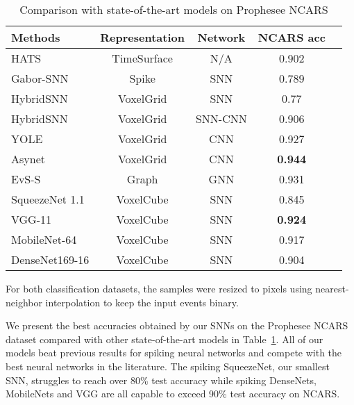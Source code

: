 \documentclass[conference]{IEEEtran}
\begin{document}
\begin{table}[]
\renewcommand{\arraystretch}{1.3}
\centering
\caption{Comparison with state-of-the-art models on Prophesee NCARS}
\begin{tabular}{lcccc}
\hline
\textbf{Methods}     & \textbf{Representation}     & \textbf{Network}   & \textbf{NCARS acc}\\ \hline
HATS \cite{ncars}       & TimeSurface   & N/A          & 0.902                        \\
Gabor-SNN \cite{ncars}   & Spike         & SNN       & 0.789                   \\
HybridSNN \cite{hybridsnn} & VoxelGrid  & SNN       & 0.77            \\
HybridSNN \cite{hybridsnn} & VoxelGrid  & SNN-CNN       & 0.906            \\
YOLE \cite{yole}       & VoxelGrid     & CNN          & 0.927                         \\
Asynet \cite{asynet}     & VoxelGrid     & CNN       & \textbf{0.944}                       \\
EvS-S \cite{graph} & Graph  & GNN       & 0.931                   \\
\hline
SqueezeNet 1.1 & VoxelCube & SNN       & 0.845                       \\ 
VGG-11 & VoxelCube & SNN       & \textbf{0.924}                       \\ 
MobileNet-64 & VoxelCube & SNN       & 0.917                       \\ 
DenseNet169-16 & VoxelCube & SNN       & 0.904                       \\ 
\hline
\end{tabular}
\label{tab:ncars}
\end{table}

For both classification datasets, the samples were resized to  pixels using nearest-neighbor interpolation to keep the input events binary.

We present the best accuracies obtained by our SNNs on the Prophesee NCARS dataset compared with other state-of-the-art models in Table~\ref{tab:ncars}. All of our models beat previous results for spiking neural networks and compete with the best neural networks in the literature. The spiking SqueezeNet, our smallest SNN, struggles to reach over 80\% test accuracy while spiking DenseNets, MobileNets and VGG are all capable to exceed 90\% test accuracy on NCARS. 
\end{document}

